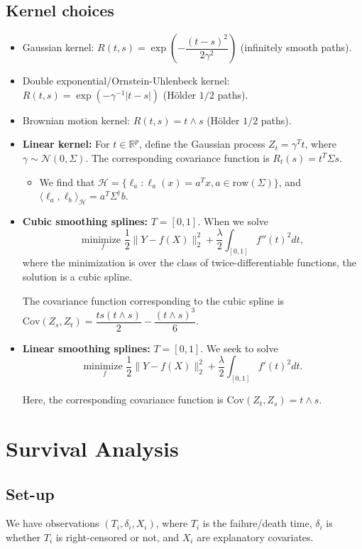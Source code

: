 \documentclass[twoside]{article}
\newcommand\bbR{\mathbb{R}}
\newcommand\calH{\mathcal{H}}
\newcommand\calN{\mathcal{N}}
\newcommand\dlt{\delta}
\newcommand\lmb{\lambda}
\newcommand\Sg{\Sigma}
\begin{document}
\subsection{Kernel choices}
\begin{itemize}
\item Gaussian kernel: $R(t,s) = \exp \left( - \dfrac{(t-s)^2}{2\gamma^2} \right)$ (infinitely smooth paths).
\item Double exponential/Ornstein-Uhlenbeck kernel: $R(t,s) = \exp(-\gamma^{-1}|t-s|)$ (H\"{o}lder $1/2$ paths).
\item Brownian motion kernel: $R(t,s) = t \wedge s$ (H\"{o}lder $1/2$ paths).

\item \textbf{Linear kernel:} For $t \in \bbR^p$, define the Gaussian process $Z_t = \gamma^T t$, where $\gamma \sim \calN(0, \Sg)$. The corresponding covariance function is $R_t(s) = t^T \Sg s$.
\begin{itemize}
\item We find that $\calH = \{ \ell_a: \ell_a(x) = a^T x, a \in \text{row}(\Sg)\}$, and $\langle \ell_a, \ell_b \rangle_\calH = a^T \Sg^\dagger b$.
\end{itemize}

\item \textbf{Cubic smoothing splines:} $T = [0,1]$. When we solve
\[ \underset{f}{\text{minimize }} \frac{1}{2}\| Y - f(X)\|_2^2 + \frac{\lmb}{2} \int_{[0,1]} f''(t)^2 dt, \]
where the minimization is over the class of twice-differentiable functions, the solution is a cubic spline.

The covariance function corresponding to the cubic spline is $\text{Cov}(Z_s, Z_t) = \dfrac{ts(t \wedge s)}{2} - \dfrac{(t \wedge s)^3}{6}$.

\item \textbf{Linear smoothing splines:} $T = [0,1]$. We seek to solve
\[ \underset{f}{\text{minimize }} \frac{1}{2}\| Y - f(X)\|_2^2 + \frac{\lmb}{2} \int_{[0,1]} f'(t)^2 dt. \]

Here, the corresponding covariance function is $\text{Cov}(Z_t, Z_s) = t \wedge s$.

\end{itemize}

\section{Survival Analysis}

\subsection{Set-up}
We have observations $(T_i, \dlt_i, X_i)$, where $T_i$ is the failure/death time, $\dlt_i$ is whether $T_i$ is right-censored or not, and $X_i$ are explanatory covariates.
\end{document}
